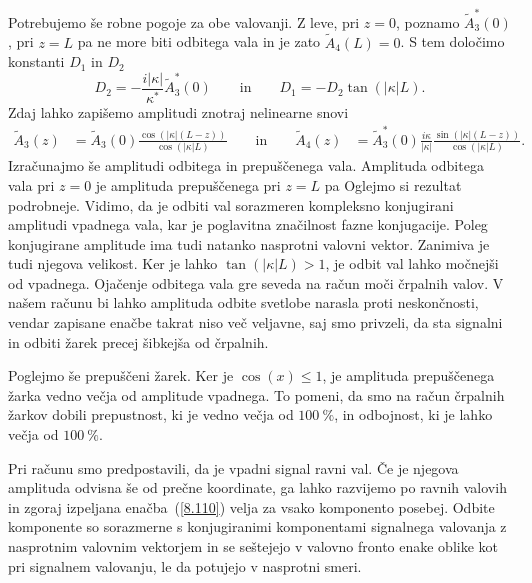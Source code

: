 Potrebujemo še robne pogoje za obe valovanji. Z leve, pri $z=0$,
poznamo $\tilde{A}_{3}^{*}\left(0\right)$, pri $z=L$ pa ne more biti odbitega
vala in je zato $\tilde{A}_{4}\left(L\right)=0$. S tem določimo konstanti $D_{1}$
in $D_{2}$
\begin{equation}
D_2 = -\frac{i|\kappa|}{\kappa^*} \tilde{A}_3^*(0) \qquad
\textrm{in} \qquad 
D_1 = -D_2 \tan(|\kappa|L). 
\end{equation}
Zdaj lahko zapišemo amplitudi znotraj nelinearne snovi
\begin{align}
\tilde{A}_{3}\left(z\right) & =  \tilde{A}_3(0)
\frac{\cos\left(|\kappa|(L-z)\right)}{\cos\left(|\kappa|L\right)}
\qquad \mathrm{in} \qquad
\tilde{A}_{4}\left(z\right) & =  \tilde{A}_3^*(0)\frac{i \kappa}{|\kappa|}
\frac{\sin\left(|\kappa|(L-z)\right)}{\cos\left(|\kappa|L\right)}.
\label{8.109}
\end{align}
Izračunajmo še amplitudi odbitega in prepuščenega vala. Amplituda odbitega vala 
pri $z=0$ je 
amplituda prepuščenega pri $z = L$ pa
Oglejmo si rezultat podrobneje. Vidimo, da je odbiti val sorazmeren 
kompleksno konjugirani amplitudi vpadnega vala, kar je poglavitna značilnost
fazne konjugacije. 
Poleg konjugirane amplitude ima tudi natanko nasprotni valovni vektor. 
Zanimiva je tudi njegova velikost. Ker 
je lahko $\tan\left(|\kappa|L\right)>1$, je odbit val lahko močnejši od vpadnega.
Ojačenje odbitega vala gre seveda na račun moči črpalnih
valov. V našem računu bi lahko amplituda odbite svetlobe narasla proti neskončnosti, 
vendar zapisane enačbe takrat niso več veljavne, saj smo privzeli, 
da sta signalni in odbiti žarek precej šibkejša od črpalnih.

Poglejmo še prepuščeni žarek. Ker je $\cos(x)\leq1$, je amplituda prepuščenega
žarka vedno večja od amplitude vpadnega. To pomeni, da smo na račun črpalnih žarkov
dobili prepustnost, ki je vedno večja od $100~\%$, in odbojnost, ki je lahko 
večja od $100~\%$.

Pri računu smo predpostavili, da je vpadni signal ravni val. Če je njegova
amplituda odvisna še od prečne koordinate, ga lahko razvijemo po ravnih
valovih in zgoraj izpeljana enačba~(\ref{8.110}) velja za vsako komponento posebej. 
Odbite komponente so sorazmerne s konjugiranimi komponentami signalnega valovanja
z nasprotnim valovnim vektorjem in se seštejejo v valovno fronto enake
oblike kot pri signalnem valovanju, le da potujejo v nasprotni smeri.

